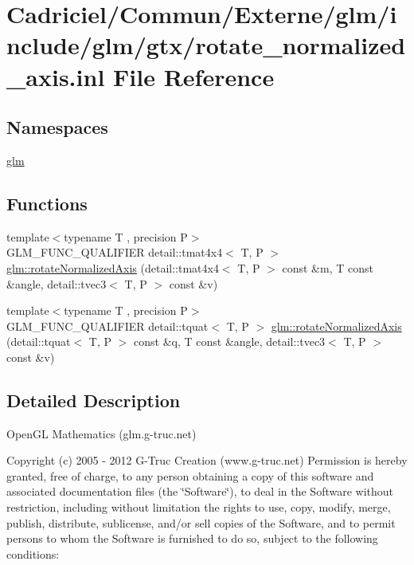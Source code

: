 \hypertarget{rotate__normalized__axis_8inl}{}\section{Cadriciel/\+Commun/\+Externe/glm/include/glm/gtx/rotate\+\_\+normalized\+\_\+axis.inl File Reference}
\label{rotate__normalized__axis_8inl}
\subsection*{Namespaces}
\begin{DoxyCompactItemize}
\item 
 \hyperlink{namespaceglm}{glm}
\end{DoxyCompactItemize}
\subsection*{Functions}
\begin{DoxyCompactItemize}
\item 
{\footnotesize template$<$typename T , precision P$>$ }\\G\+L\+M\+\_\+\+F\+U\+N\+C\+\_\+\+Q\+U\+A\+L\+I\+F\+I\+ER detail\+::tmat4x4$<$ T, P $>$ \hyperlink{group__gtx__rotate__normalized__axis_gac47b4efcecdaf7e892b10ae89135c544}{glm\+::rotate\+Normalized\+Axis} (detail\+::tmat4x4$<$ T, P $>$ const \&m, T const \&angle, detail\+::tvec3$<$ T, P $>$ const \&v)
\item 
{\footnotesize template$<$typename T , precision P$>$ }\\G\+L\+M\+\_\+\+F\+U\+N\+C\+\_\+\+Q\+U\+A\+L\+I\+F\+I\+ER detail\+::tquat$<$ T, P $>$ \hyperlink{group__gtx__rotate__normalized__axis_ga774f0f09fc99b3a967001cb116aa7f2a}{glm\+::rotate\+Normalized\+Axis} (detail\+::tquat$<$ T, P $>$ const \&q, T const \&angle, detail\+::tvec3$<$ T, P $>$ const \&v)
\end{DoxyCompactItemize}


\subsection{Detailed Description}
Open\+GL Mathematics (glm.\+g-\/truc.\+net)

Copyright (c) 2005 -\/ 2012 G-\/\+Truc Creation (www.\+g-\/truc.\+net) Permission is hereby granted, free of charge, to any person obtaining a copy of this software and associated documentation files (the \char`\"{}\+Software\char`\"{}), to deal in the Software without restriction, including without limitation the rights to use, copy, modify, merge, publish, distribute, sublicense, and/or sell copies of the Software, and to permit persons to whom the Software is furnished to do so, subject to the following conditions\+:

